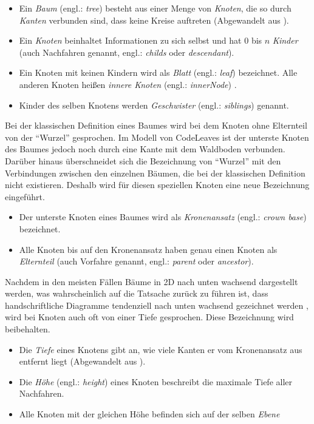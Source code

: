 \begin{itemize}
  \item Ein \textit{Baum} (engl.: \textit{tree}) besteht aus einer Menge von \textit{Knoten}, die so durch \textit{Kanten} verbunden sind, dass keine Kreise auftreten (Abgewandelt aus \cite{gumm2009einfuehrung, ernst2016grundkurs}).
  \item Ein \textit{Knoten} beinhaltet Informationen zu sich selbst und hat $0$ bis $n$ \textit{Kinder} (auch Nachfahren genannt, engl.: \textit{childs} oder \textit{descendant}).
  \item Ein Knoten mit keinen Kindern wird als \textit{Blatt} (engl.: \textit{leaf}) bezeichnet. Alle anderen Knoten heißen \textit{innere Knoten} (engl.: \textit{innerNode}) \cite{gumm2009einfuehrung}.
  \item Kinder des selben Knotens werden \textit{Geschwister} (engl.: \textit{siblings}) genannt.
\end{itemize}

Bei der klassischen Definition eines Baumes wird bei dem Knoten ohne Elternteil von der "`Wurzel"' gesprochen. Im Modell von CodeLeaves ist der unterste Knoten des Baumes jedoch noch durch eine Kante mit dem Waldboden verbunden. Darüber hinaus überschneidet sich die Bezeichnung von "`Wurzel"' mit den Verbindungen zwischen den einzelnen Bäumen, die bei der klassischen Definition nicht existieren. Deshalb wird für diesen speziellen Knoten eine neue Bezeichnung eingeführt.

\begin{itemize}
  \item Der unterste Knoten eines Baumes wird als \textit{Kronenansatz} (engl.: \textit{crown base}) bezeichnet.
  \item Alle Knoten bis auf den Kronenansatz haben genau einen Knoten als \textit{Elternteil} (auch Vorfahre genannt, engl.: \textit{parent} oder \textit{ancestor}).
\end{itemize}

Nachdem in den meisten Fällen Bäume in 2D nach unten wachsend dargestellt werden, was wahrscheinlich auf die Tatsache zurück zu führen ist, dass handschriftliche Diagramme tendenziell nach unten wachsend gezeichnet werden \cite{knuth1973fundamental}, wird bei Knoten auch oft von einer Tiefe gesprochen. Diese Bezeichnung wird beibehalten.

\begin{itemize}
  \item Die \textit{Tiefe} eines Knotens gibt an, wie viele Kanten er vom Kronenansatz aus entfernt liegt (Abgewandelt aus \cite{ernst2016grundkurs}).
  \item Die \textit{Höhe} (engl.: \textit{height}) eines Knoten beschreibt die maximale Tiefe aller Nachfahren.
  \item Alle Knoten mit der gleichen Höhe befinden sich auf der selben \textit{Ebene}
\end{itemize}

